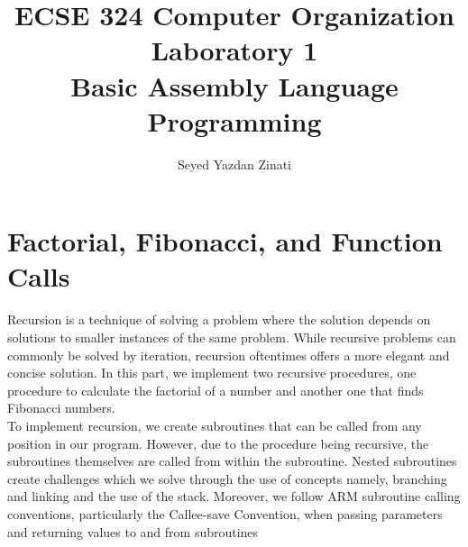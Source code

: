 \documentclass[10pt]{article}
\begin{document}
\title{\textbf{ECSE 324 Computer Organization}\\
    Laboratory 1\\
    Basic Assembly Language Programming
}

\author{Seyed Yazdan Zinati}
\maketitle

\begin{abstract}
    \blindtext
\end{abstract}

\section{Factorial, Fibonacci, and Function Calls}
Recursion is a technique of solving a problem where the solution depends on solutions to smaller instances of the same problem. While recursive problems can commonly be solved by iteration, recursion oftentimes offers a more elegant and concise solution. In this part, we implement two recursive procedures, one procedure to calculate the factorial of a number and another one that finds Fibonacci numbers.\\
To implement recursion, we create subroutines that can be called from any position in our program. However, due to the procedure being recursive, the subroutines themselves are called from within the subroutine. Nested subroutines create challenges which we solve through the use of concepts namely, branching and linking and the use of the stack. Moreover, we follow ARM subroutine calling conventions, particularly the Callee-save Convention, when passing parameters and returning values to and from subroutines
\end{document}
